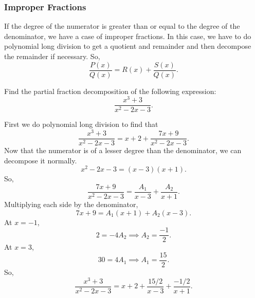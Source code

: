 \subsubsection{Improper Fractions}
\noindent
If the degree of the numerator is greater than or equal to the degree of the denominator, we have a case of improper fractions.
In this case, we have to do polynomial long division to get a quotient and remainder and then decompose the remainder if necessary.
So,
\begin{equation*}
	\frac{P(x)}{Q(x)} = R(x) + \frac{S(x)}{Q(x)}.
\end{equation*}

\begin{example}
	Find the partial fraction decomposition of the following expression:
	\begin{equation*}
		\frac{x^3+3}{x^2-2x-3}.
	\end{equation*}
\end{example}
\noindent
First we do polynomial long division to find that
\begin{equation*}
	\frac{x^3+3}{x^2-2x-3} = x + 2 + \frac{7x+9}{x^2-2x-3}.
\end{equation*}
Now that the numerator is of a lesser degree than the denominator, we can decompose it normally.
\begin{equation*}
	x^2-2x-3 = (x-3)(x+1).
\end{equation*}
So,
\begin{equation*}
	\frac{7x+9}{x^2-2x-3} = \frac{A_1}{x-3} + \frac{A_2}{x+1}.
\end{equation*}
Multiplying each side by the denominator,
\begin{equation*}
	7x+9 = A_1(x+1) + A_2(x-3).
\end{equation*}
At $x=-1$,
\begin{equation*}
	2 = -4A_2 \implies A_2 = \frac{-1}{2}.
\end{equation*}
At $x=3$,
\begin{equation*}
	30 = 4A_1 \implies A_1 = \frac{15}{2}.
\end{equation*}
So,
\begin{equation*}
	\frac{x^3+3}{x^2-2x-3} = x + 2 + \frac{15/2}{x-3} + \frac{-1/2}{x+1}.
\end{equation*}